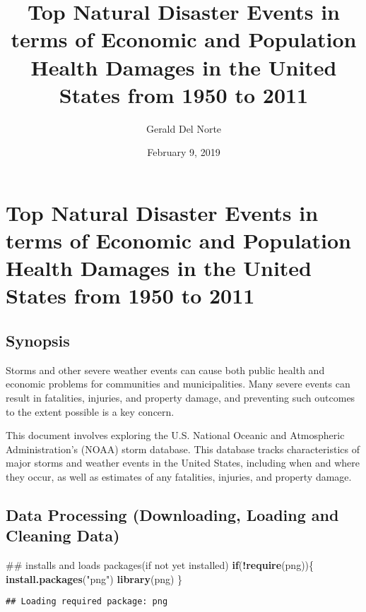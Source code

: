 \documentclass[]{article}
\title{Top Natural Disaster Events in terms of Economic and Population Health
Damages in the United States from 1950 to 2011}
\author{Gerald Del Norte}
\date{February 9, 2019}
\newenvironment{Shaded}{\begin{snugshade}}{\end{snugshade}}
\newcommand{\KeywordTok}[1]{\textcolor[rgb]{0.13,0.29,0.53}{\textbf{#1}}}
\newcommand{\StringTok}[1]{\textcolor[rgb]{0.31,0.60,0.02}{#1}}
\newcommand{\ControlFlowTok}[1]{\textcolor[rgb]{0.13,0.29,0.53}{\textbf{#1}}}
\newcommand{\OperatorTok}[1]{\textcolor[rgb]{0.81,0.36,0.00}{\textbf{#1}}}
\newcommand{\NormalTok}[1]{#1}
\begin{document}
\maketitle

\section{Top Natural Disaster Events in terms of Economic and Population
Health Damages in the United States from 1950 to
2011}\label{top-natural-disaster-events-in-terms-of-economic-and-population-health-damages-in-the-united-states-from-1950-to-2011}

\subsection{Synopsis}\label{synopsis}

Storms and other severe weather events can cause both public health and
economic problems for communities and municipalities. Many severe events
can result in fatalities, injuries, and property damage, and preventing
such outcomes to the extent possible is a key concern.

This document involves exploring the U.S. National Oceanic and
Atmospheric Administration's (NOAA) storm database. This database tracks
characteristics of major storms and weather events in the United States,
including when and where they occur, as well as estimates of any
fatalities, injuries, and property damage.

\subsection{Data Processing (Downloading, Loading and Cleaning
Data)}\label{data-processing-downloading-loading-and-cleaning-data}

\begin{Shaded}
\begin{Highlighting}[]
\NormalTok{## installs and loads packages(if not yet installed)}
\ControlFlowTok{if}\NormalTok{(}\OperatorTok{!}\KeywordTok{require}\NormalTok{(png))\{}
  \KeywordTok{install.packages}\NormalTok{(}\StringTok{"png"}\NormalTok{)}
  \KeywordTok{library}\NormalTok{(png)}
\NormalTok{\}}
\end{Highlighting}
\end{Shaded}

\begin{verbatim}
## Loading required package: png
\end{verbatim}
\end{document}
